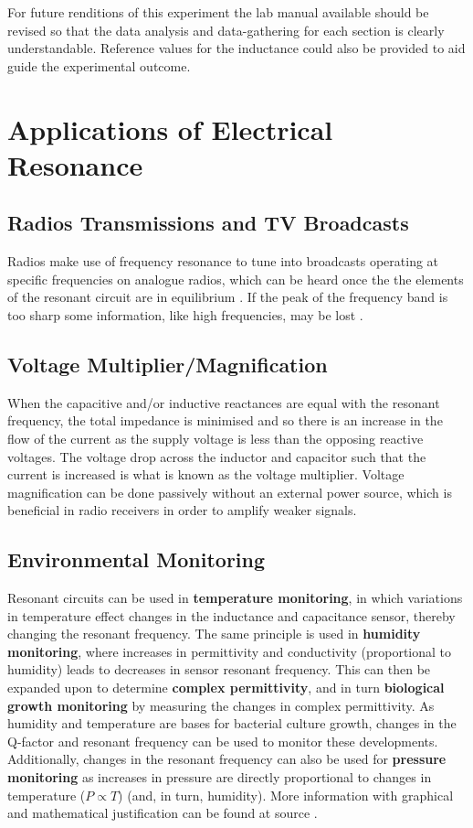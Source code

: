\documentclass[12pt]{article}
\begin{document}
For future renditions of this experiment the lab manual available should be revised so that the data analysis and data-gathering for each section is clearly understandable. Reference values for the inductance
could also be provided to aid guide the experimental outcome.

\section{Applications of Electrical Resonance}

\subsection{Radios Transmissions and TV Broadcasts}

Radios make use of frequency resonance to tune into broadcasts operating at specific frequencies on analogue radios, which can be heard once the the elements of the resonant circuit are in equilibrium
\cite{radio}. 
If the peak of the frequency band is too sharp some information, like high frequencies, may be lost
\cite{UCDlcr}.

\subsection{Voltage Multiplier/Magnification}

When the capacitive and/or inductive reactances are equal with the resonant frequency, the total impedance is minimised and so there is an increase in the flow of the current 
as the supply voltage is less than the opposing reactive voltages.
The voltage drop across the inductor and capacitor such that the current is increased is what is known as the voltage multiplier.
Voltage magnification can be done passively without an external power source, which is beneficial in radio receivers in order to amplify weaker signals.
\cite{geekresonance, radio}

\subsection{Environmental Monitoring}

Resonant circuits can be used in \textbf{temperature monitoring}, in which variations in \break temperature effect changes in the inductance and capacitance sensor, thereby changing the resonant frequency.
The same principle is used in \textbf{humidity monitoring}, where increases in permittivity and conductivity (proportional to humidity) leads to decreases in sensor resonant 
frequency.
This can then be expanded upon to determine \textbf{complex permittivity}, and in turn \textbf{biological growth monitoring} by measuring the changes in complex permittivity.
As humidity and temperature are bases for bacterial culture growth, changes in the Q-factor and resonant frequency can be used to monitor these developments.
Additionally, changes in the resonant frequency can also be used for \textbf{pressure monitoring} as increases in pressure are directly proportional to changes in temperature ($P \propto T$) (and, in turn, humidity).
More information with graphical and mathematical justification can be found at source \cite{ONG200133}.
\end{document}
